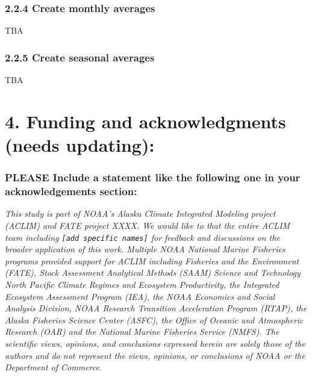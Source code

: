 \documentclass[
]{article}
\begin{document}
\hypertarget{create-monthly-averages}{%
\subsubsection{2.2.4 Create monthly
averages}\label{create-monthly-averages}}

TBA

\hypertarget{create-seasonal-averages}{%
\subsubsection{2.2.5 Create seasonal
averages}\label{create-seasonal-averages}}

TBA

\hypertarget{funding-and-acknowledgments-needs-updating}{%
\section{4. Funding and acknowledgments (needs
updating):}\label{funding-and-acknowledgments-needs-updating}}

\hypertarget{please-include-a-statement-like-the-following-one-in-your-acknowledgements-section}{%
\subsubsection{PLEASE Include a statement like the following one in your
acknowledgements
section:}\label{please-include-a-statement-like-the-following-one-in-your-acknowledgements-section}}

\emph{This study is part of NOAA's Alaska Climate Integrated Modeling
project (ACLIM) and FATE project XXXX. We would like to that the entire
ACLIM team including \texttt{{[}add\ specific\ names{]}} for feedback
and discussions on the broader application of this work. Multiple NOAA
National Marine Fisheries programs provided support for ACLIM including
Fisheries and the Environment (FATE), Stock Assessment Analytical
Methods (SAAM) Science and Technology North Pacific Climate Regimes and
Ecosystem Productivity, the Integrated Ecosystem Assessment Program
(IEA), the NOAA Economics and Social Analysis Division, NOAA Research
Transition Acceleration Program (RTAP), the Alaska Fisheries Science
Center (ASFC), the Office of Oceanic and Atmospheric Research (OAR) and
the National Marine Fisheries Service (NMFS). The scientific views,
opinions, and conclusions expressed herein are solely those of the
authors and do not represent the views, opinions, or conclusions of NOAA
or the Department of Commerce.}
\end{document}
